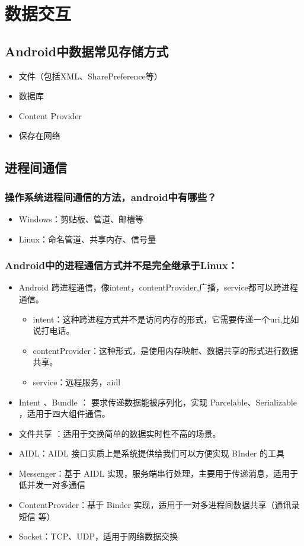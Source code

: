 \documentclass[9pt, b5paper]{article}
\begin{document}
\section{数据交互}
\label{sec-3}
\subsection{Android中数据常见存储方式}
\label{sec-3-1}
\begin{itemize}
\item 文件（包括XML、SharePreference等）
\item 数据库
\item Content Provider
\item 保存在网络
\end{itemize}
\subsection{进程间通信}
\label{sec-3-2}
\subsubsection{操作系统进程间通信的方法，android中有哪些？}
\label{sec-3-2-1}
\begin{itemize}
\item Windows：剪贴板、管道、邮槽等
\item Linux：命名管道、共享内存、信号量
\end{itemize}
\subsubsection{Android中的进程通信方式并不是完全继承于Linux：}
\label{sec-3-2-2}
\begin{itemize}
\item Android 跨进程通信，像intent，contentProvider,广播，service都可以跨进程通信。
\begin{itemize}
\item intent：这种跨进程方式并不是访问内存的形式，它需要传递一个uri,比如说打电话。
\item contentProvider：这种形式，是使用内存映射、数据共享的形式进行数据共享。
\item service：远程服务，aidl
\end{itemize}
\item Intent 、Bundle ： 要求传递数据能被序列化，实现 Parcelable、Serializable ，适用于四大组件通信。
\item 文件共享 ：适用于交换简单的数据实时性不高的场景。
\item AIDL：AIDL 接口实质上是系统提供给我们可以方便实现 BInder 的工具
\item Messenger：基于 AIDL 实现，服务端串行处理，主要用于传递消息，适用于低并发一对多通信
\item ContentProvider：基于 Binder 实现，适用于一对多进程间数据共享（通讯录 短信 等）
\item Socket：TCP、UDP，适用于网络数据交换
\end{itemize}
\end{document}
